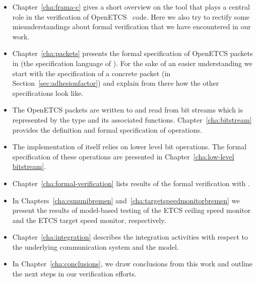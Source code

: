 \begin{itemize}
\item
Chapter~\ref{cha:frama-c} gives a short overview on the \framacwp tool
that plays a central role in the verification of OpenETCS \isoc~code.
Here we also try to rectify some misunderstandings about formal verification
that we have encountered in our work.

\item
Chapter~\ref{cha:packets} presents the formal specification of OpenETCS
packets in \acsl (the specification language of \framac).
For the sake of an easier understanding we start with the specification of
a concrete packet (\adhesion in Section~\ref{sec:adhesionfactor})
and explain from there how the other specifications look like.

\item
The OpenETCS packets are written to and read from bit streams which is represented
by the type  and its associated functions.
Chapter~\ref{cha:bitstream} provides the definition and formal specification
of  operations.

\item
The implementation of  itself relies on lower level bit operations.
The formal specification of these operations are presented in Chapter~\ref{cha:low-level bitstream}.

\item 
Chapter~\ref{cha:formal-verification} lists results of the formal verification with \framacwp.

\item
In Chapters~\ref{cha:csmunibremen} and~\ref{cha:targetspeedmonitorbremen}
we present the results of model-based testing of the ETCS ceiling speed monitor and
the ETCS target speed monitor, respectively.

\item 
Chapter~\ref{cha:integration} describes the integration activities with respect to the underlying
communication system and the \scade model.

\item
In Chapter~\ref{cha:conclusions}, we draw conclusions from this work
and outline the next steps in our verification efforts.
\end{itemize}

